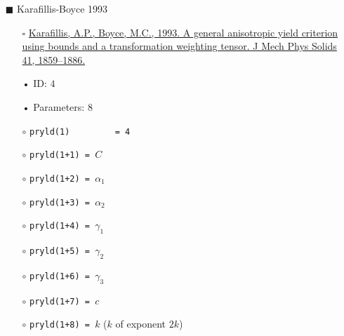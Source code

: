 \documentclass[11pt,a4paper,twoside,final,onecolumn,titlepage]{article}
\begin{document}
\begin{itemize}
	\item[\tiny$\blacksquare$] Karafillis-Boyce 1993
	\begin{itemize}
		\item[\tiny$\square$] {\small \href{https://doi.org/10.1016/0022-5096(93)90073-o}{Karafillis, A.P., Boyce, M.C., 1993. A general anisotropic yield criterion using bounds and a transformation weighting tensor. J Mech Phys Solids 41, 1859–1886.}}\\
		\item[•] ID: $4$
		\item[•] Parameters: $8$\\
		\item[$\circ$] \texttt{pryld(1)\,\,\,\,\,\,\,\,\,= 4}
		\item[$\circ$] \texttt{pryld(1+1) = $C$}
		\item[$\circ$] \texttt{pryld(1+2) = $\alpha_1$}
		\item[$\circ$] \texttt{pryld(1+3) = $\alpha_2$}
		\item[$\circ$] \texttt{pryld(1+4) = $\gamma_1$}
		\item[$\circ$] \texttt{pryld(1+5) = $\gamma_2$}
		\item[$\circ$] \texttt{pryld(1+6) = $\gamma_3$}
		\item[$\circ$] \texttt{pryld(1+7) = $c$}
		\item[$\circ$] \texttt{pryld(1+8) = $k$} ($k$ of exponent $2k$)\\
	\end{itemize}
\end{itemize}
\end{document}
